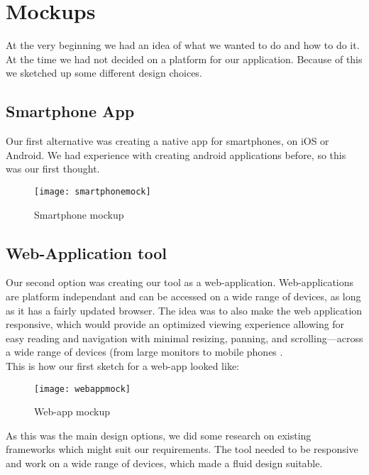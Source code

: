 \section{Mockups}
At the very beginning we had an idea of what we wanted to do and how to do it. At the time we had not decided on a platform for our application. Because of this we sketched up some different design choices.

\subsection{Smartphone App}
Our first alternative was creating a native app for smartphones, on iOS or Android. We had experience with creating android applications before, so this was our first thought. 
\begin{figure}[h!]
\label{smartphonemock}
\centering
	\texttt{[image: smartphonemock]}
\caption{Smartphone mockup}
\end{figure}

\subsection{Web-Application tool}
Our second option was creating our tool as a web-application. Web-applications are platform independant and can be accessed on a wide range of devices, as long as it has a fairly updated browser. The idea was to also make the web application responsive, which would provide an optimized viewing experience allowing for easy reading and navigation with minimal resizing, panning, and scrolling—across a wide range of devices (from large monitors to mobile phones .\\
This is how our first sketch for a web-app looked like: 
\begin{figure}[h!]
\label{webappmock}
\centering 
	\texttt{[image: webappmock]}
\caption{Web-app mockup}
\end{figure}
As this was the main design options, we did some research on existing frameworks which might suit our requirements. The tool needed to be responsive and work on a wide range of devices, which made a fluid design suitable.

